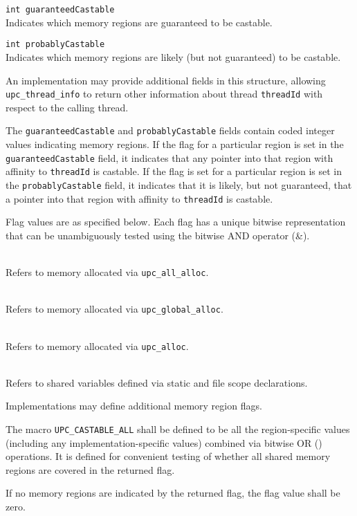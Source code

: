 \begin{description}
\item{\tt int guaranteedCastable} \hfill \\
Indicates which memory regions are guaranteed to be castable.
\item{\tt int probablyCastable} \hfill \\
Indicates which memory regions are likely (but not guaranteed)
to be castable.
\end{description}

\np An implementation may provide additional fields in this structure,
allowing {\tt upc\_thread\_info} to return other information about
thread {\tt threadId} with respect to the calling thread.

\np The {\tt guaranteedCastable} and {\tt probablyCastable} fields
contain coded integer values indicating memory regions.  If the flag
for a particular region is set in the {\tt guaranteedCastable} field,
it indicates that
any pointer into that region with affinity to {\tt threadId} is
castable.  If the flag is
set for a particular region is set in the {\tt probablyCastable} field,
it indicates that it is likely, but not guaranteed, that a pointer into
that region with affinity to {\tt threadId} is castable.

\np Flag values are as specified below.  Each flag has a
unique bitwise representation that can be unambiguously tested using the
bitwise AND operator (\&).

\begin{description}
\item[{\tt UPC\_CASTABLE\_ALL\_ALLOC}] \hfill \\
Refers to memory allocated via {\tt upc\_all\_alloc}.
\item[{\tt UPC\_CASTABLE\_GLOBAL\_ALLOC}] \hfill \\
Refers to memory allocated via {\tt upc\_global\_alloc}.
\item[{\tt UPC\_CASTABLE\_ALLOC}] \hfill \\
Refers to memory allocated via {\tt upc\_alloc}.
\item[{\tt UPC\_CASTABLE\_STATIC}] \hfill \\
Refers to shared variables defined via static and file scope declarations.
\end{description}

\np Implementations may define additional memory region flags.

\np The macro {\tt UPC\_CASTABLE\_ALL} shall
be defined to be all the region-specific values (including any
implementation-specific values) combined via bitwise
OR ({\textbar}) operations.  It is defined for convenient testing of
whether all shared memory regions are covered in the returned flag.

\np If no memory regions are indicated by the returned flag, the flag
value shall be zero.

\pagebreak
\appendix
